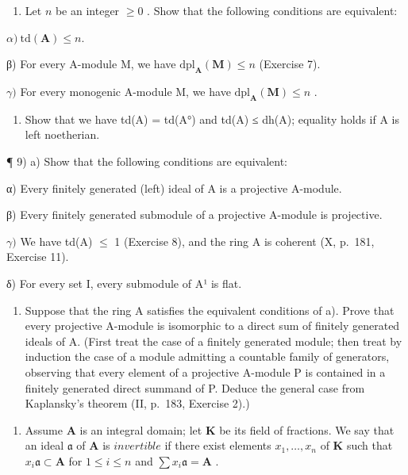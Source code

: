 \begin{enumerate}
\def\labelenumi{\alph{enumi})}
\tightlist
\item
  Let \(n\) be an integer \(\geqslant 0\) . Show that the following conditions are equivalent:
\end{enumerate}

\(\alpha)\ \mathrm{td}(\mathbf{A}) \leqslant n.\)

β) For every A-module M, we have \(\mathrm{dpl}_{\mathbf{A}}(\mathbf{M}) \leqslant n\) (Exercise 7).

\(\gamma)\) For every monogenic A-module M, we have \(\mathrm{dpl}_{\mathbf{A}}(\mathbf{M}) \leqslant n\) .

\begin{enumerate}
\def\labelenumi{\alph{enumi})}
\setcounter{enumi}{1}
\tightlist
\item
  Show that we have td(A) = td(A°) and td(A) ≤ dh(A); equality holds if A is left noetherian.
\end{enumerate}

¶ 9) a) Show that the following conditions are equivalent:

α) Every finitely generated (left) ideal of A is a projective A-module.

β) Every finitely generated submodule of a projective A-module is projective.

\(\gamma)\) We have td(A) \(\leqslant\) 1 (Exercise 8), and the ring A is coherent (X, p.~181, Exercise 11).

δ) For every set I, every submodule of A¹ is flat.

\begin{enumerate}
\def\labelenumi{\alph{enumi})}
\setcounter{enumi}{1}
\tightlist
\item
  Suppose that the ring A satisfies the equivalent conditions of a). Prove that every projective A-module is isomorphic to a direct sum of finitely generated ideals of A. (First treat the case of a finitely generated module; then treat by induction the case of a module admitting a countable family of generators, observing that every element of a projective A-module P is contained in a finitely generated direct summand of P. Deduce the general case from Kaplansky's theorem (II, p.~183, Exercise 2).)
\end{enumerate}

\begin{enumerate}
\def\labelenumi{\arabic{enumi})}
\setcounter{enumi}{9}
\tightlist
\item
  Assume \(\mathbf{A}\) is an integral domain; let \(\mathbf{K}\) be its field of fractions. We say that an ideal \(\mathfrak{a}\) of \(\mathbf{A}\) is \(invertible\) if there exist elements \(x_{1},\ldots ,x_{n}\) of \(\mathbf{K}\) such that \(x_{i}\mathfrak{a}\subset \mathbf{A}\) for \(1\leqslant i\leqslant n\) and \(\sum x_i\mathfrak{a} = \mathbf{A}\) .
\end{enumerate}

